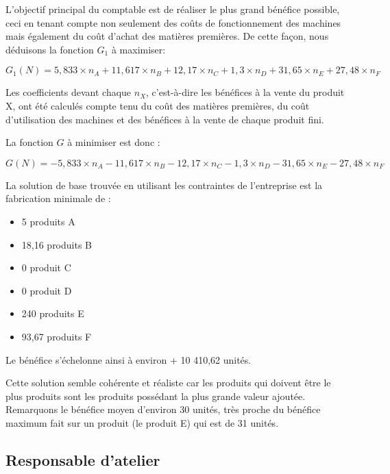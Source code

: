 \documentclass[a4paper,10pt]{article}
\begin{document}
L'objectif principal du comptable est de réaliser le plus grand bénéfice possible, ceci en tenant compte non seulement des coûts de fonctionnement des machines mais également du coût d'achat des matières premières. De cette façon, nous déduisons la fonction $G_1$ à maximiser:

$$G_1(N) = 5,833 \times n_A + 11,617 \times n_B + 12,17 \times n_C + 1,3 \times n_D + 31,65 \times n_E + 27,48 \times n_F$$

Les coefficients devant chaque $n_X$, c'est-à-dire les bénéfices à la vente du produit X, ont été calculés compte tenu du coût des matières premières, du coût d'utilisation des machines et des bénéfices à la vente de chaque produit fini.\newline


La fonction $G$ à minimiser est donc :

$$G(N) = -5,833 \times n_A - 11,617 \times n_B - 12,17 \times n_C - 1,3 \times n_D - 31,65 \times n_E - 27,48 \times n_F$$

La solution de base trouvée en utilisant les contraintes de l'entreprise est la fabrication minimale de :\newline
\begin{itemize}
\item[\textbullet] 5 produits A
\item[\textbullet] 18,16 produits B
\item[\textbullet] 0 produit C
\item[\textbullet] 0 produit D
\item[\textbullet] 240 produits E
\item[\textbullet] 93,67 produits F\newline
\end{itemize}
Le bénéfice s'échelonne ainsi à environ + 10 410,62 unités.\newline

Cette solution semble cohérente et réaliste car les produits qui doivent être le plus produits sont les produits possédant la plus grande valeur ajoutée. Remarquons le bénéfice moyen d'environ 30 unités, très proche du bénéfice maximum fait sur un produit (le produit E) qui est de 31 unités.


\subsection{Responsable d'atelier}
\end{document}
